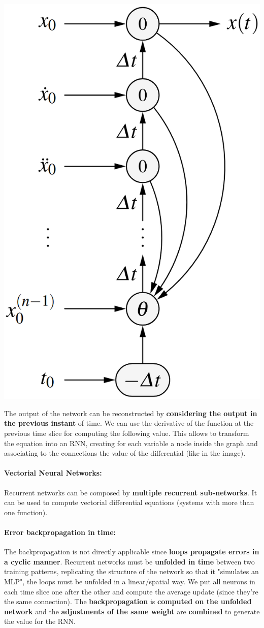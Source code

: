 \documentclass[11pt]{article}
\begin{document}
		\begin{center}
			\includegraphics[width=0.4\columnwidth]{img/NN/RN1}
		\end{center}
		The output of the network can be reconstructed by \textbf{considering the output in the previous instant} of time. We can use the derivative of the function at the previous time slice for computing the following value. This allows to transform the equation into an RNN, creating for each variable a node inside the graph and associating to the connections the value of the differential (like in the image).\\
		
		\paragraph{Vectorial Neural Networks:} Recurrent networks can be composed by \textbf{multiple recurrent sub-networks}. It can be used to compute vectorial differential equations (systems with more than one function).
		
		\paragraph{Error backpropagation in time:}  The backpropagation is not directly applicable since \textbf{loops propagate errors in a cyclic manner}. Recurrent networks must be \textbf{unfolded in time} between two training patterns, replicating the structure of the network so that it "simulates an MLP", the loops must be unfolded in a linear/spatial way. We put all neurons in each time slice one after the other and compute the average update (since they're the same connection). The \textbf{backpropagation} is \textbf{computed on the unfolded network} and the \textbf{adjustments of the same weight} are \textbf{combined} to generate the value for the RNN.\\
		
\end{document}
